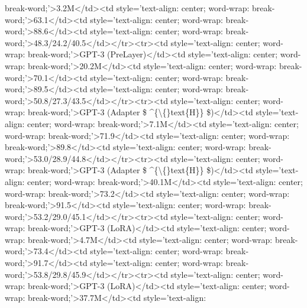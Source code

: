 \documentclass[conference]{IEEEtran}
\begin{document}
break-word;'\textgreater{}3.2M\textless{}/td\textgreater{}\textless{}td style='text-align: center; word-wrap: break-word;'\textgreater{}63.1\textless{}/td\textgreater{}\textless{}td style='text-align: center; word-wrap: break-word;'\textgreater{}88.6\textless{}/td\textgreater{}\textless{}td style='text-align: center; word-wrap: break-word;'\textgreater{}48.3/24.2/40.5\textless{}/td\textgreater{}\textless{}/tr\textgreater{}\textless{}tr\textgreater{}\textless{}td style='text-align: center; word-wrap: break-word;'\textgreater{}GPT-3 (PreLayer)\textless{}/td\textgreater{}\textless{}td style='text-align: center; word-wrap: break-word;'\textgreater{}20.2M\textless{}/td\textgreater{}\textless{}td style='text-align: center; word-wrap: break-word;'\textgreater{}70.1\textless{}/td\textgreater{}\textless{}td style='text-align: center; word-wrap: break-word;'\textgreater{}89.5\textless{}/td\textgreater{}\textless{}td style='text-align: center; word-wrap: break-word;'\textgreater{}50.8/27.3/43.5\textless{}/td\textgreater{}\textless{}/tr\textgreater{}\textless{}tr\textgreater{}\textless{}td style='text-align: center; word-wrap: break-word;'\textgreater{}GPT-3 (Adapter \$ \textasciicircum{}\{\textbackslash\{\}text\{H\}\} \$)\textless{}/td\textgreater{}\textless{}td style='text-align: center; word-wrap: break-word;'\textgreater{}7.1M\textless{}/td\textgreater{}\textless{}td style='text-align: center; word-wrap: break-word;'\textgreater{}71.9\textless{}/td\textgreater{}\textless{}td style='text-align: center; word-wrap: break-word;'\textgreater{}89.8\textless{}/td\textgreater{}\textless{}td style='text-align: center; word-wrap: break-word;'\textgreater{}53.0/28.9/44.8\textless{}/td\textgreater{}\textless{}/tr\textgreater{}\textless{}tr\textgreater{}\textless{}td style='text-align: center; word-wrap: break-word;'\textgreater{}GPT-3 (Adapter \$ \textasciicircum{}\{\textbackslash\{\}text\{H\}\} \$)\textless{}/td\textgreater{}\textless{}td style='text-align: center; word-wrap: break-word;'\textgreater{}40.1M\textless{}/td\textgreater{}\textless{}td style='text-align: center; word-wrap: break-word;'\textgreater{}73.2\textless{}/td\textgreater{}\textless{}td style='text-align: center; word-wrap: break-word;'\textgreater{}91.5\textless{}/td\textgreater{}\textless{}td style='text-align: center; word-wrap: break-word;'\textgreater{}53.2/29.0/45.1\textless{}/td\textgreater{}\textless{}/tr\textgreater{}\textless{}tr\textgreater{}\textless{}td style='text-align: center; word-wrap: break-word;'\textgreater{}GPT-3 (LoRA)\textless{}/td\textgreater{}\textless{}td style='text-align: center; word-wrap: break-word;'\textgreater{}4.7M\textless{}/td\textgreater{}\textless{}td style='text-align: center; word-wrap: break-word;'\textgreater{}73.4\textless{}/td\textgreater{}\textless{}td style='text-align: center; word-wrap: break-word;'\textgreater{}91.7\textless{}/td\textgreater{}\textless{}td style='text-align: center; word-wrap: break-word;'\textgreater{}53.8/29.8/45.9\textless{}/td\textgreater{}\textless{}/tr\textgreater{}\textless{}tr\textgreater{}\textless{}td style='text-align: center; word-wrap: break-word;'\textgreater{}GPT-3 (LoRA)\textless{}/td\textgreater{}\textless{}td style='text-align: center; word-wrap: break-word;'\textgreater{}37.7M\textless{}/td\textgreater{}\textless{}td style='text-align: 
\end{document}
